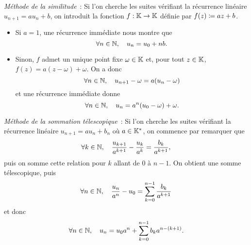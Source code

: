 \documentclass{magnolia}
\begin{document}
\vspace{2ex}
\begin{remarques}
\remarque \emph{Méthode de la similitude}~: Si l'on cherche les suites vérifiant la
  récurrence linéaire $u_{n+1}=a u_n+b$, on introduit la fonction $f:\mathbb{K}\to\mathbb{K}$ définie
  par $f(z)\coloneqq az+b$.
  \begin{itemize}
  \item Si $a=1$, une récurrence immédiate nous montre que
    \[\forall n\in\mathbb{N},\quad u_n=u_0 + nb.\]
  \item Sinon, $f$ admet un unique point fixe $\omega\in\mathbb{K}$ et, pour tout $z\in\mathbb{K}$, $f(z)=a(z-\omega)+\omega$.
    On a donc
    \[\forall n\in\mathbb{N},\quad u_{n+1}-\omega=a(u_n-\omega)\]
    et une récurrence immédiate donne
    \[\forall n\in\mathbb{N},\quad u_n = a^n(u_0-\omega) +\omega.\]
  \end{itemize}
\remarque \emph{Méthode de la sommation télescopique}~: Si l'on cherche les suites
  vérifiant la récurrence linéaire $u_{n+1}= a u_n + b_n$ où $a\in\mathbb{K}^*$, on commence par remarquer que
\[\forall k\in\mathbb{N},\quad \frac{u_{k+1}}{a^{k+1}} - \frac{u_k}{a^k}=\frac{b_k}{a^{k+1}},\]
puis on somme cette relation pour $k$ allant de 0 à $n-1$. On obtient une somme télescopique, puis
\[\forall n\in\mathbb{N},\quad \frac{u_n}{a^n}-u_0=\sum_{k=0}^{n-1} \frac{b_k}{a^{k+1}}\]
et donc
\[\forall n\in\mathbb{N},\quad u_n=u_0 a^n + \sum_{k=0}^{n-1} b_k a^{n-(k+1)}.\]
\end{remarques}
\end{document}
